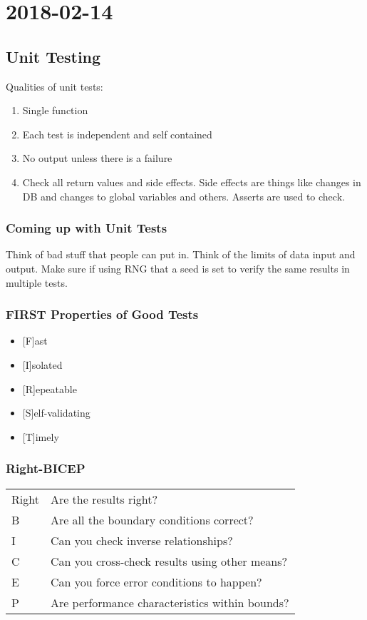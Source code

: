 \documentclass{report}
\newcommand{\mychapter}[2]{
	\setcounter{chapter}{#1}
	\setcounter{section}{0}
	\chapter*{#2}
	\addcontentsline{toc}{chapter}{#2}
}
\begin{document}
 
\tableofcontents{}
\mychapter{1}{2018-02-14}
\section{Unit Testing}
Qualities of unit tests:
\begin{enumerate}
\item Single function
\item Each test is independent and self contained
\item No output unless there is a failure
\item Check all return values and side effects. Side effects are things like changes in DB and changes to global variables and others. Asserts are used to check.
\end{enumerate}
\subsection{Coming up with Unit Tests}
Think of bad stuff that people can put in. Think of the limits of data input and output. Make sure if using RNG that a seed is set to verify the same results in multiple tests.\\

\subsection{FIRST Properties of Good Tests}
\begin{itemize}
\item {[}F{]}ast
\item {[}I{]}solated
\item {[}R{]}epeatable
\item {[}S{]}elf-validating
\item {[}T{]}imely
\end{itemize}

\subsection{Right-BICEP}
\begin{tabular}{ll}
Right & Are the results right?\\
B & Are all the boundary conditions correct?\\
I & Can you check inverse relationships?\\
C & Can you cross-check results using other means?\\
E & Can you force error conditions to happen?\\
P & Are performance characteristics within bounds?\\
\end{tabular}
\end{document}
